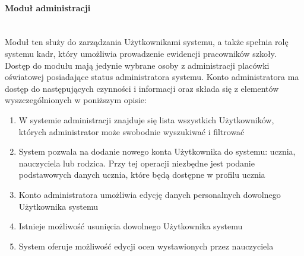 \documentclass{article}
\begin{document}
\paragraph{Moduł administracji} \mbox{}\\
Moduł ten służy do zarządzania Użytkownikami systemu, a także spełnia rolę systemu kadr, który umożliwia prowadzenie ewidencji pracowników szkoły.\\Dostęp do modułu mają jedynie wybrane osoby z administracji placówki oświatowej posiadające status administratora systemu. Konto administratora ma dostęp do następujących czynności i informacji oraz składa się z elementów wyszczególnionych w poniższym opisie:
\begin{enumerate}
\item W systemie administracji znajduje się lista wszystkich Użytkowników, których administrator może swobodnie wyszukiwać i filtrować
\item System pozwala na dodanie nowego konta Użytkownika do systemu: ucznia, nauczyciela lub rodzica. Przy tej operacji niezbędne jest podanie podstawowych danych ucznia, które będą dostępne w profilu ucznia
\item Konto administratora umożliwia edycję danych personalnych dowolnego Użytkownika systemu
\item Istnieje możliwość usunięcia dowolnego Użytkownika systemu
\item System oferuje możliwość edycji ocen wystawionych przez nauczyciela


\end{enumerate}
\end{document}

